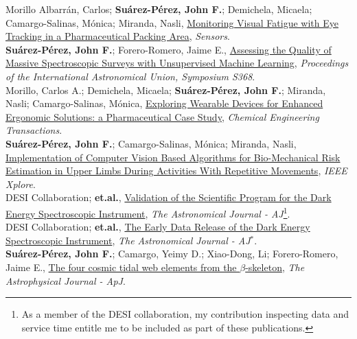 \documentclass[10pt, a4paper]{article}
\newcommand{\years}[1]{\marginnote{\scriptsize #1}}
\begin{document}
\years{2025}Morillo Albarrán, Carlos; \textbf{Suárez-Pérez, John F.}; Demichela, Micaela; Camargo-Salinas, Mónica; Miranda, Nasli, \href{https://www.mdpi.com/1424-8220/25/18/5702}{Monitoring Visual Fatigue with Eye Tracking in a Pharmaceutical Packing Area}, \emph{Sensors}.
\\

\years{2025}\textbf{Suárez-Pérez, John F.}; Forero-Romero, Jaime E., \href{https://www.cambridge.org/core/journals/proceedings-of-the-international-astronomical-union/article/abs/assessing-the-quality-of-massive-spectroscopic-surveys-with-unsupervised-machine-learning/E40E4ED6D22975318BD8D11ED8E3BA32}{Assessing the Quality of Massive Spectroscopic Surveys with Unsupervised Machine Learning}, \emph{Proceedings of the International Astronomical Union, Symposium S368}.
\\

\years{2025}Morillo, Carlos A.; Demichela, Micaela; \textbf{Suárez-Pérez, John F.}; Miranda, Nasli; Camargo-Salinas, Mónica, \href{https://www.cetjournal.it/cet/25/116/005.pdf}{Exploring Wearable Devices for Enhanced Ergonomic Solutions: a Pharmaceutical Case Study}, \emph{Chemical Engineering Transactions}.
\\
\newpage
\years{2024}\textbf{Suárez-Pérez, John F.}; Camargo-Salinas, Mónica; Miranda, Nasli, \href{Suárez-Pérez, John F.; Camargo-Salinas, Mónica; Miranda, Nasli}{Implementation of Computer Vision Based Algorithms for Bio-Mechanical Risk Estimation in Upper Limbs During Activities With Repetitive Movements}, \emph{IEEE Xplore}.
\\

\years{2024}DESI Collaboration; \textbf{et.al.}, \href{https://iopscience.iop.org/article/10.3847/1538-3881/ad0b08/pdf}{Validation of the 
Scientific Program for the Dark Energy Spectroscopic Instrument}, \emph{The Astronomical Journal - AJ}\footnote[1]{As a member of the DESI collaboration, my contribution inspecting data and service time entitle me to be included as part of these publications.}.
\\

\years{2024}DESI Collaboration; \textbf{et.al.}, \href{https://arxiv.org/abs/2306.06308}{The Early Data Release of the Dark Energy Spectroscopic Instrument}, \emph{The Astronomical Journal - AJ}$^{*}$.
\\

\years{2021}\textbf{Suárez-Pérez, John F.}; Camargo, Yeimy D.; Xiao-Dong, Li; Forero-Romero, 
Jaime E., \href{https://iopscience.iop.org/article/10.3847/1538-4357/ac1fed/pdf}{The four cosmic tidal web elements from the $\beta$-skeleton}, \emph{The Astrophysical Journal - ApJ}. 
\\
\end{document}
